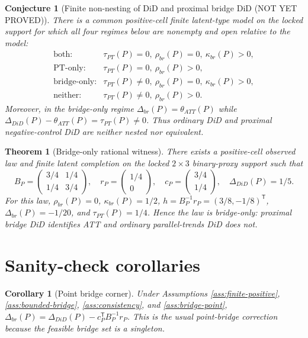 \documentclass[11pt]{article}
\newcommand{\transpose}{\mathsf{T}}
\theoremstyle{definition}
\theoremstyle{plain}
\newtheorem{theorem}{Theorem}
\newtheorem{conjecture}{Conjecture}
\newtheorem{corollary}{Corollary}
\theoremstyle{remark}
\begin{document}
\begin{conjecture}[Finite non-nesting of DiD and proximal bridge DiD (NOT YET PROVED)]
There is a common positive-cell finite latent-type model on the locked support for which all four regimes below are nonempty and open relative to the model:
\[
\begin{array}{ll}
\text{both:} & \tau_{PT}(P)=0,\ \rho_{br}(P)=0,\ \kappa_{br}(P)>0,\\
\text{PT-only:} & \tau_{PT}(P)=0,\ \rho_{br}(P)>0,\\
\text{bridge-only:} & \tau_{PT}(P)\ne0,\ \rho_{br}(P)=0,\ \kappa_{br}(P)>0,\\
\text{neither:} & \tau_{PT}(P)\ne0,\ \rho_{br}(P)>0.
\end{array}
\]
Moreover, in the bridge-only regime \(\Delta_{br}(P)=\theta_{ATT}(P)\) while \(\Delta_{DiD}(P)-\theta_{ATT}(P)=\tau_{PT}(P)\ne0\). Thus ordinary DiD and proximal negative-control DiD are neither nested nor equivalent.
\end{conjecture}

\begin{theorem}[Bridge-only rational witness]
There exists a positive-cell observed law and finite latent completion on the locked \(2\times3\) binary-proxy support such that
\[
B_P=\begin{pmatrix}3/4&1/4\\1/4&3/4\end{pmatrix},\quad
r_P=\begin{pmatrix}1/4\\0\end{pmatrix},\quad
c_P=\begin{pmatrix}3/4\\1/4\end{pmatrix},\quad
\Delta_{DiD}(P)=1/5.
\]
For this law, \(\rho_{br}(P)=0\), \(\kappa_{br}(P)=1/2\), \(h=B_P^{-1}r_P=(3/8,-1/8)^\transpose\), \(\Delta_{br}(P)=-1/20\), and \(\tau_{PT}(P)=1/4\). Hence the law is bridge-only: proximal bridge DiD identifies ATT and ordinary parallel-trends DiD does not.
\end{theorem}

\section{Sanity-check corollaries}
\begin{corollary}[Point bridge corner]
Under Assumptions \ref{ass:finite-positive}, \ref{ass:bounded-bridge}, \ref{ass:consistency}, and \ref{ass:bridge-point}, \(\Delta_{br}(P)=\Delta_{DiD}(P)-c_P^\transpose B_P^{-1}r_P\). This is the usual point-bridge correction because the feasible bridge set is a singleton.
\end{corollary}
\end{document}
